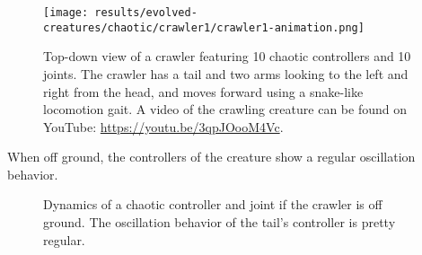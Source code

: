 \documentclass[main]{subfiles}
\begin{document}
\begin{figure}[H]
\centering
\texttt{[image: results/evolved-creatures/chaotic/crawler1/crawler1-animation.png]}
\caption[Figure of a crawler using chaotic controllers.]{Top-down view of a crawler featuring 10 chaotic controllers and 10 joints. The crawler has a tail and two arms looking to the left and right from the head, and moves forward using a snake-like locomotion gait. A video of the crawling creature can be found on YouTube: \url{https://youtu.be/3qpJOooM4Vc}.}
\label{figure:successfulcreatures-chaotic-crawler1}
\end{figure}

When off ground, the controllers of the creature show a regular oscillation behavior. %

\begin{figure}[H]
\centering
	\begin{minipage}{1.3\textwidth}
	\hspace*{-5em}
	\end{minipage}
\caption[Off ground controller dynamics of the crawler]{Dynamics of a chaotic controller and joint if the crawler is off ground. The oscillation behavior of the tail's controller is pretty regular.}
\label{figure:crawler1-off-ground-controller-dynamics}
\end{figure}
\end{document}

